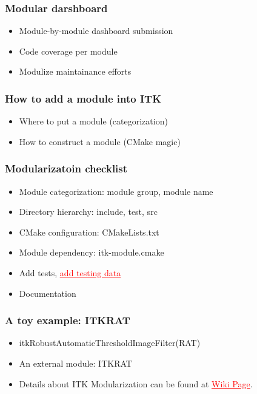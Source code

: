 \begin{frame}
\frametitle{Modular darshboard }
\begin{itemize}
\item  Module-by-module dashboard submission
\pause
\item  Code coverage per module
\pause
\item  Modulize  maintainance efforts
\end{itemize}
\end{frame}


\begin{frame}
\frametitle{How to add a module into ITK}
\begin{itemize}
\item Where to put a module (categorization)
\pause
\item How to construct a module (CMake magic)
\end{itemize}
\end{frame}


\begin{frame}
\frametitle{Modularizatoin checklist}
\begin{itemize}
\item  Module categorization: module group, module name
\pause
\item  Directory hierarchy: include, test, src
\pause
\item  CMake configuration: CMakeLists.txt
\pause
\item  Module dependency: itk-module.cmake
\pause
\item  Add tests, \href{http://www.vtk.org/Wiki/ITK/Git/Develop/Data\#Workflow}{\textcolor{red}{\underline{add testing data}}}
\pause
\item  Documentation
\end{itemize}
\end{frame}


\begin{frame}
\frametitle{A toy example: ITKRAT}
\begin{itemize}
\item  itkRobustAutomaticThresholdImageFilter(RAT)
\pause
\item  An external module: ITKRAT
\end{itemize}
\end{frame}


\begin{frame}
\begin{itemize}
\item  Details about ITK Modularization can be found at \href{http://www.itk.org/Wiki/ITK\_Release\_4/Modularization}{\textcolor{red}{\underline{Wiki Page}}}.
\end{itemize}
\end{frame}
